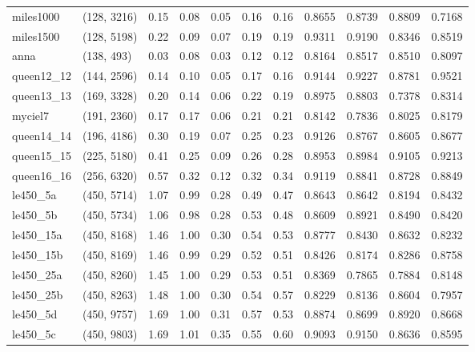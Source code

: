 \begin{tabular}{llrrrrrrrrr}
 miles1000 &  (128, 3216) &  0.15 & 0.08 & 0.05 &  0.16 &   0.16 &   0.8655 &   0.8739 &     0.8809 &      0.7168 \\
 miles1500 &  (128, 5198) &  0.22 & 0.09 & 0.07 &  0.19 &   0.19 &   0.9311 &   0.9190 &     0.8346 &      0.8519 \\
      anna &   (138, 493) &  0.03 & 0.08 & 0.03 &  0.12 &   0.12 &   0.8164 &   0.8517 &     0.8510 &      0.8097 \\
queen12\_12 &  (144, 2596) &  0.14 & 0.10 & 0.05 &  0.17 &   0.16 &   0.9144 &   0.9227 &     0.8781 &      0.9521 \\
queen13\_13 &  (169, 3328) &  0.20 & 0.14 & 0.06 &  0.22 &   0.19 &   0.8975 &   0.8803 &     0.7378 &      0.8314 \\
   myciel7 &  (191, 2360) &  0.17 & 0.17 & 0.06 &  0.21 &   0.21 &   0.8142 &   0.7836 &     0.8025 &      0.8179 \\
queen14\_14 &  (196, 4186) &  0.30 & 0.19 & 0.07 &  0.25 &   0.23 &   0.9126 &   0.8767 &     0.8605 &      0.8677 \\
queen15\_15 &  (225, 5180) &  0.41 & 0.25 & 0.09 &  0.26 &   0.28 &   0.8953 &   0.8984 &     0.9105 &      0.9213 \\
queen16\_16 &  (256, 6320) &  0.57 & 0.32 & 0.12 &  0.32 &   0.34 &   0.9119 &   0.8841 &     0.8728 &      0.8849 \\
  le450\_5a &  (450, 5714) &  1.07 & 0.99 & 0.28 &  0.49 &   0.47 &   0.8643 &   0.8642 &     0.8194 &      0.8432 \\
  le450\_5b &  (450, 5734) &  1.06 & 0.98 & 0.28 &  0.53 &   0.48 &   0.8609 &   0.8921 &     0.8490 &      0.8420 \\
 le450\_15a &  (450, 8168) &  1.46 & 1.00 & 0.30 &  0.54 &   0.53 &   0.8777 &   0.8430 &     0.8632 &      0.8232 \\
 le450\_15b &  (450, 8169) &  1.46 & 0.99 & 0.29 &  0.52 &   0.51 &   0.8426 &   0.8174 &     0.8286 &      0.8758 \\
 le450\_25a &  (450, 8260) &  1.45 & 1.00 & 0.29 &  0.53 &   0.51 &   0.8369 &   0.7865 &     0.7884 &      0.8148 \\
 le450\_25b &  (450, 8263) &  1.48 & 1.00 & 0.30 &  0.54 &   0.57 &   0.8229 &   0.8136 &     0.8604 &      0.7957 \\
  le450\_5d &  (450, 9757) &  1.69 & 1.00 & 0.31 &  0.57 &   0.53 &   0.8874 &   0.8699 &     0.8920 &      0.8668 \\
  le450\_5c &  (450, 9803) &  1.69 & 1.01 & 0.35 &  0.55 &   0.60 &   0.9093 &   0.9150 &     0.8636 &      0.8595 \\

\end{tabular}
